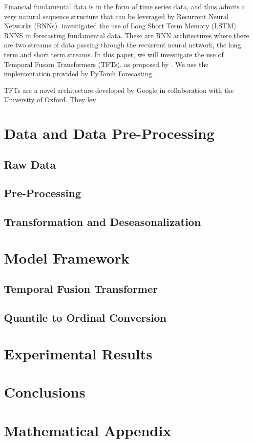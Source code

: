 \documentclass[AER]{AEA}
\begin{document}
Financial fundamental data is in the form of time series data, and thus admits a very natural sequence 
structure that can be leveraged by Recurrent Neural Networks (RNNs). \cite{euclidean} investigated the use of 
Long Short Term Memory (LSTM) RNNS in forecasting fundamental data. These are RNN architectures where there are 
two streams of data passing through the recurrent neural network, the long term and short term streams. In this 
paper, we will investigate the use of Temporal Fusion Transformers (TFTs), as proposed by \cite{tft}. We use 
the implementation provided by PyTorch Forecasting. 

TFTs are a novel architecture developed by Google in collaboration with the University of Oxford. They lev


\section{Data and Data Pre-Processing}
\subsection{Raw Data}
\subsection{Pre-Processing}
\subsection{Transformation and Deseasonalization}
\section{Model Framework}
\subsection{Temporal Fusion Transformer}
\subsection{Quantile to Ordinal Conversion}
\section{Experimental Results}
\section{Conclusions}




\appendix

\section{Mathematical Appendix}
\end{document}
